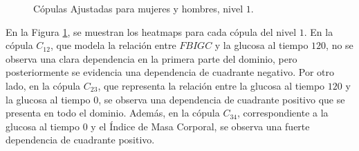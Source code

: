 \begin{figure}[H]
 \centering
    \caption{Cópulas Ajustadas para mujeres y hombres, nivel $1$.}
    \label{fig:Modelo4TotalNivel1}
\end{figure}

En la Figura \ref{fig:Modelo4TotalNivel1}, se muestran los heatmaps para cada cópula del nivel $1$. En la cópula $C_{12}$, que modela la relación entre $FBIGC$ y la glucosa al tiempo $120$, no se observa una clara dependencia en la primera parte del dominio, pero posteriormente se evidencia una dependencia de cuadrante negativo. Por otro lado, en la cópula $C_{23}$, que representa la relación entre la glucosa al tiempo $120$ y la glucosa al tiempo $0$, se observa una dependencia de cuadrante positivo que se presenta en todo el dominio. Además, en la cópula $C_{34}$, correspondiente a la glucosa al tiempo $0$ y el Índice de Masa Corporal, se observa una fuerte dependencia de cuadrante positivo.

